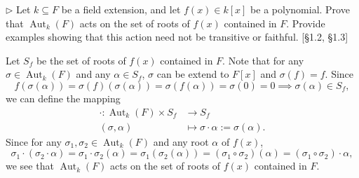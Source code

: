 \documentclass[12pt,letterpaper,boxed]{hmcpset}
\begin{document}
\begin{problem}[1.6]
$\triangleright$ Let $k \subseteq F$ be a field extension, and let $f(x) \in k[x]$ be a polynomial. Prove that $\operatorname{Aut}_{k}(F)$ acts on the set of roots of $f(x)$ contained in $F$. Provide examples showing that this action need not be transitive or faithful. [\S1.2, \S1.3]
\end{problem}
\begin{solution}
Let $S_f$ be the set of roots of $f(x)$ contained in $F$. Note that for any $\sigma\in\operatorname{Aut}_{k}(F)$ and any $\alpha\in S_f$, $\sigma$ can be extend to $F[x]$ and $\sigma(f)=f$. Since
\[
f(\sigma(\alpha))=\sigma(f)(\sigma(\alpha))=\sigma(f(\alpha))=\sigma(0)=0\implies\sigma(\alpha)\in S_f,
\]
we can define the mapping
\begin{align*}
	\cdot:\operatorname{Aut}_{k}(F)\times S_f &\longrightarrow S_f\\
	(\sigma, \alpha) &\longmapsto  \sigma\cdot\alpha:=\sigma(\alpha).
\end{align*}
Since for any $\sigma_1,\sigma_2\in\operatorname{Aut}_{k}(F)$ and any root $\alpha$ of $f(x)$,
\[
\sigma_1\cdot(\sigma_2\cdot\alpha)=\sigma_1\cdot\sigma_2(\alpha)=\sigma_1(\sigma_2(\alpha))=(\sigma_1\circ\sigma_2)(\alpha)=(\sigma_1\circ\sigma_2)\cdot\alpha,
\]
we see that $\operatorname{Aut}_{k}(F)$ acts on the set of roots of $f(x)$ contained in $F$.
\end{solution}
\end{document}

